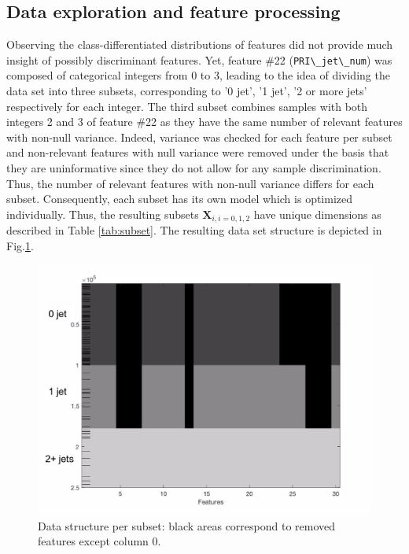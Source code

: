 \documentclass[10pt,conference,compsocconf]{IEEEtran}
\begin{document}
\subsection{Data exploration and feature processing}
Observing the class-differentiated distributions of features did not provide much insight of possibly discriminant features. 
Yet, feature \#22 (\verb|PRI\_jet\_num|) was composed of categorical integers from 0 to 3, leading to the idea of dividing the data set into three subsets, corresponding to '0 jet', '1 jet', '2 or more jets' respectively for each integer. 
The third subset combines samples with both integers 2 and 3 of feature \#22 as they have the same number of relevant features with non-null variance.
Indeed, variance was checked for each feature per subset and non-relevant features with null variance were removed under the basis that they are uninformative since they do not allow for any sample discrimination.
Thus, the number of relevant features with non-null variance differs for each subset. Consequently, each subset has its own model which is optimized individually.
Thus, the resulting subsets $\mathbf{X}_{i, i=0,1,2}$ have unique dimensions as described in Table \ref{tab:subset}. The resulting data set structure is depicted in Fig.\ref{data}.

\begin{figure}
\begin{center}
\includegraphics[scale=0.22]{data.png}
\caption{Data structure per subset: black areas correspond to removed features except column 0.}
\label{data}
\end{center}
\end{figure}
\end{document}
